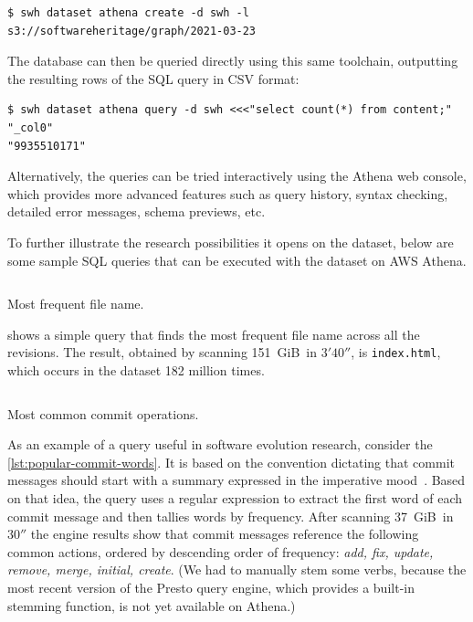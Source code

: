 \begin{verbatim}
$ swh dataset athena create -d swh -l s3://softwareheritage/graph/2021-03-23
\end{verbatim}

The database can then be queried directly using this same toolchain, outputting
the resulting rows of the SQL query in CSV format:

\begin{verbatim}
$ swh dataset athena query -d swh <<<"select count(*) from content;"
"_col0"
"9935510171"
\end{verbatim}

Alternatively, the queries can be tried interactively using the Athena web
console, which provides more advanced features such as query history, syntax
checking, detailed error messages, schema previews, etc.

To further illustrate the research possibilities it opens on the dataset, below
are some sample SQL queries that can be executed with the dataset on
\textsc{AWS} Athena.

\begin{listing}
    \inputminted[firstline=4]{sql}{codesamples/graph-dataset/popular-file.sql}
    \caption{Most frequent file name.}%
    \label{lst:popular-file}
\end{listing}

 shows a simple query
that finds the most frequent file name across all the revisions.
The result, obtained by scanning
151~GiB\ in $3'40''$, is \texttt{index.html}, which occurs in the dataset 182
million times.

\begin{listing}
    \inputminted[firstline=3]{sql}{codesamples/graph-dataset/popular-commit-words.sql}
    \caption{Most common commit operations.}%
    \label{lst:popular-commit-words}
\end{listing}

As an example of a query useful in software evolution research,
consider the \cref{lst:popular-commit-words}.
It is based on the convention dictating that commit messages should
start with a summary expressed in the imperative mood~\cite[3.3.2.1]{Fre19}.
Based on that idea, the query uses a regular expression to extract the first
word of each commit message and then tallies words by frequency.
After scanning 37~GiB\ in $30''$ the engine results show that commit messages
reference the following common actions, ordered by descending order of
frequency:
\emph{add, fix, update, remove, merge, initial, create}.
(We had to manually stem some verbs,
because the most recent version of the Presto query engine,
which provides a built-in stemming function,
is not yet available on Athena.)

